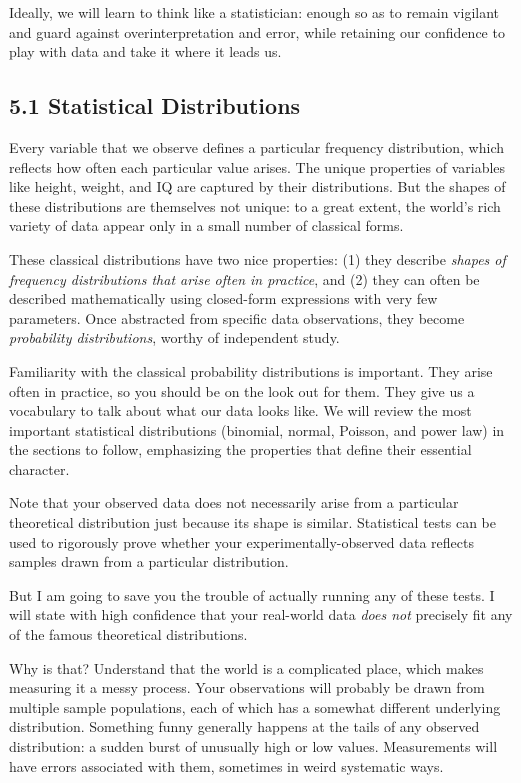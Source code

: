 \documentclass[10pt]{article}
\begin{document}
Ideally, we will learn to think like a statistician: enough so as to remain vigilant and guard against overinterpretation and error, while retaining our confidence to play with data and take it where it leads us.

\subsection*{5.1 Statistical Distributions}
Every variable that we observe defines a particular frequency distribution, which reflects how often each particular value arises. The unique properties of variables like height, weight, and IQ are captured by their distributions. But the shapes of these distributions are themselves not unique: to a great extent, the world's rich variety of data appear only in a small number of classical forms.

These classical distributions have two nice properties: (1) they describe \emph{shapes of frequency distributions that arise often in practice}, and (2) they can often be described mathematically using closed-form expressions with very few parameters. Once abstracted from specific data observations, they become \emph{probability distributions}, worthy of independent study.

Familiarity with the classical probability distributions is important. They arise often in practice, so you should be on the look out for them. They give us a vocabulary to talk about what our data looks like. We will review the most important statistical distributions (binomial, normal, Poisson, and power law) in the sections to follow, emphasizing the properties that define their essential character.

Note that your observed data does not necessarily arise from a particular theoretical distribution just because its shape is similar. Statistical tests can be used to rigorously prove whether your experimentally-observed data reflects samples drawn from a particular distribution.

But I am going to save you the trouble of actually running any of these tests. I will state with high confidence that your real-world data \emph{does not} precisely fit any of the famous theoretical distributions.

Why is that? Understand that the world is a complicated place, which makes measuring it a messy process. Your observations will probably be drawn from multiple sample populations, each of which has a somewhat different underlying distribution. Something funny generally happens at the tails of any observed distribution: a sudden burst of unusually high or low values. Measurements will have errors associated with them, sometimes in weird systematic ways.
\end{document}
